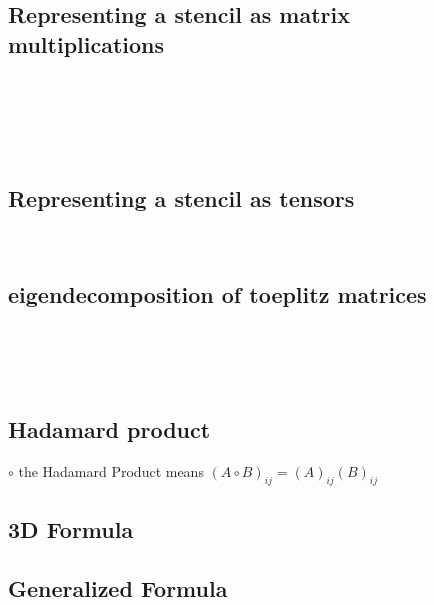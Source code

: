\documentclass[conference]{IEEEtran}
\begin{document}
\subsection{Representing a stencil as matrix multiplications}
 \\
 \\
 \\
 \\
\clearpage
\subsection{Representing a stencil as tensors}
 \\





\clearpage
\subsection{eigendecomposition of toeplitz matrices}


 \\ \\ \\ 
\clearpage
\subsection{Hadamard product}

$\circ$ the Hadamard Product means ${(A \circ B)}_{ij} = (A)_{ij} (B)_{ij}$ \\ 

 
\clearpage
\subsection{3D Formula}



\clearpage
\subsection{Generalized Formula}





\end{document}
